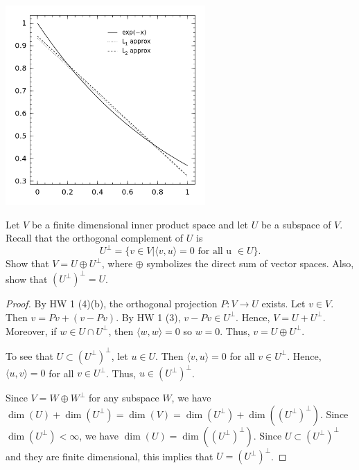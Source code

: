 \documentclass{article}
\begin{document}
\includegraphics[height = 3in] {approx.png}


 Let $V$ be a finite dimensional inner product space and let $U$ be a subspace of $V$. Recall that the orthogonal complement of $U$ is 
$$U^\perp = \{v \in V | \langle v,u \rangle = 0 \text{ for all u } \in U\}.$$
Show that $V = U \oplus U^\perp$, where $\oplus$ symbolizes the direct sum of vector spaces. Also, show that $(U^\perp)^\perp = U$.
\begin{proof}
By HW 1 (4)(b), the orthogonal projection $P : V \to U$ exists.  Let $v \in V$. Then $v = Pv + (v - Pv)$. By HW 1 (3), $v - Pv \in U^\perp$. Hence, $V = U + U^\perp$.  Moreover, if $w \in U \cap U^\perp$, then $\langle w, w \rangle = 0$ so $w = 0$. Thus, $v = U \oplus U^\perp$.

To see that $U \subset (U^\perp)^\perp$, let  $u \in U$. Then $\langle v,u \rangle = 0$ for all $v \in U^\perp$. Hence, $\langle u,v \rangle = 0$ for all $v \in U^\perp$. Thus, $u \in (U^\perp)^\perp$.

Since $V = W \oplus W^\perp$ for any subspace $W$, we have $\dim (U) + \dim(U^\perp) = \dim (V) = \dim (U^\perp) + \dim((U^\perp)^\perp)$. Since $\dim(U^\perp) < \infty$, we have $\dim(U) = \dim((U^\perp)^\perp)$.  Since $U \subset (U^\perp)^\perp$ and they are finite dimensional, this implies that $U = (U^\perp)^\perp$.

\end{proof}
\end{document}
